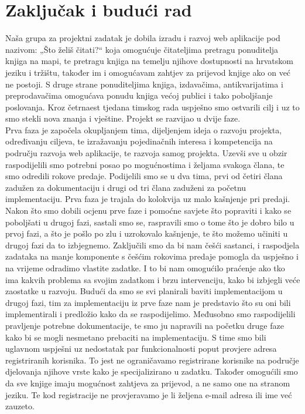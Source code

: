 \chapter{Zaključak i budući rad}
		

		
		 Naša grupa za projektni zadatak je dobila izradu i razvoj web aplikacije pod nazivom: „Što želiš čitati?“  koja omogućuje čitateljima pretragu ponuditelja knjiga na mapi, te pretragu knjiga na temelju njihove dostupnosti na hrvatskom jeziku i tržištu, također im i omogućavam zahtjev za prijevod knjige ako on već ne postoji. S druge strane ponuditeljima knjiga, izdavačima, antikvarijatima i preprodavačima omogućava ponudu knjiga većoj publici i tako poboljšanje poslovanja. Kroz četrnaest tjedana timskog rada uspješno smo ostvarili cilj i uz to smo stekli nova znanja i vještine. Projekt se razvijao u dvije faze. \\
		
		 Prva faza je započela okupljanjem tima, dijeljenjem ideja o razvoju projekta, određivanju ciljeva, te izražavanju pojedinačnih interesa i kompetencija na području razvoja web aplikacije, te razvoja samog projekta. Uzevši sve u obzir raspodijelili smo potrebni posao po mogućnostima i željama svakoga člana, te smo odredili rokove predaje. Podijelili smo se u dva tima, prvi od četiri člana zadužen za dokumentaciju i drugi od tri člana zaduženi za početnu implementaciju. Prva faza je trajala do kolokvija uz malo kašnjenje pri predaji. \\
   
          Nakon što smo dobili ocjenu prve faze i pomoćne savjete što popraviti i kako se poboljšati u drugoj fazi, sastali smo se, raspravili smo o tome što je dobro bilo u prvoj fazi, a što je pošlo po zlu i uzrokovalo kašnjenje, te što možemo učiniti u drugoj fazi da to izbjegnemo. Zaključili smo da bi nam češći sastanci, i raspodjela zadataka na manje komponente s češćim rokovima predaje pomogla da uspješno i na vrijeme odradimo vlastite zadatke. I to bi nam omogućilo praćenje ako tko ima kakvih problema sa svojim zadatkom i brzu intervenciju, kako bi izbjegli veće zaostatke u razvoju.  Budući da smo se svi planirali baviti implementacijom u drugoj fazi, tim za implementaciju iz prve faze nam je predstavio što su oni bili implementirali i predložio kako da se raspodijelimo. Međusobno smo raspodijelili pravljenje potrebne dokumentacije, te smo ju napravili na početku druge faze kako bi se mogli nesmetano prebaciti na implementaciju.  S time smo bili uglavnom uspješni uz nedostatak par funkcionalnosti poput provjere adresa registriranih korisnika. To jest ne ograničavamo registrirane korisnike na područje djelovanja njihove vrste kako je specijalizirano u zadatku. Također omogućili smo da sve knjige imaju mogućnost zahtjeva za prijevod, a ne samo one na stranom jeziku.  Te kod registracije ne provjeravamo je li željena e-mail adresa ili ime već zauzeto. \\
          
